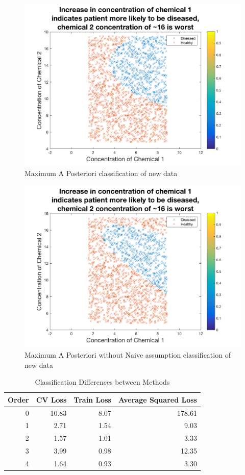{{	\begin{figure}[h]
		\centering
		\includegraphics[width=0.8\linewidth]{images/MAPnewData}
		\caption{Maximum A Posteriori classification of new data}
		\label{fig:MAP}
	\end{figure}
	
	\begin{figure}[h]
		\centering
		\includegraphics[width=0.8\linewidth]{images/MAPWONnewData}
		\caption{Maximum A Posteriori without Naive assumption classification of new data}
		\label{fig:MAPWON}
	\end{figure}
	
	\begin{table}[h]
		\centering
		\caption{Classification Differences between Methods}
		\label{t:ModLoss}
		\begin{tabular}{rrrr}
			\hline
			\textbf{Order} & \textbf{CV Loss} & \textbf{Train Loss} & \textbf{Average Squared Loss} \\ \hline
			0 & 10.83 & 8.07 & 178.61 \\
			1 & 2.71 & 1.54 & 9.03 \\
			2 & 1.57 & 1.01 & 3.33 \\
			3 & 3.99 & 0.98 & 12.35 \\
			4 & 1.64 & 0.93 & 3.30
		\end{tabular}
	\end{table}
	
}}
